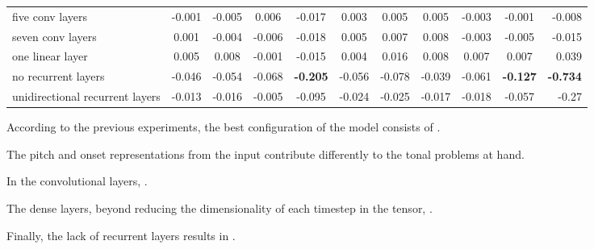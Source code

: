 \begin{table}[]
\begin{tabular}{lcccccccccr}
    five conv layers                & -0.001         & -0.005         & 0.006           & -0.017          & 0.003           & 0.005           & 0.005           & -0.003          & -0.001          & -0.008               \\
    seven conv layers               & 0.001          & -0.004         & -0.006          & -0.018          & 0.005           & 0.007           & 0.008           & -0.003          & -0.005          & -0.015               \\
    one linear layer                & 0.005          & 0.008          & -0.001          & -0.015          & 0.004           & 0.016           & 0.008           & 0.007           & 0.007           & 0.039                \\
    no recurrent layers             & -0.046         & -0.054         & -0.068          & \textbf{-0.205} & -0.056          & -0.078          & -0.039          & -0.061          & \textbf{-0.127} & \textbf{-0.734}      \\
    unidirectional recurrent layers & -0.013         & -0.016         & -0.005          & -0.095          & -0.024          & -0.025          & -0.017          & -0.018          & -0.057          & -0.27               
    \end{tabular}
    \end{table}


According to the previous experiments, the best
configuration of the model consists of .

The pitch and onset representations from the input
contribute differently to the tonal problems at hand.

In the convolutional layers, .

The dense layers, beyond reducing the dimensionality of each
timestep in the tensor, .

Finally, the lack of recurrent layers results in
.

